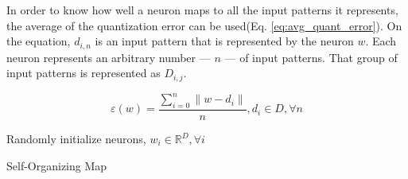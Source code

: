 \documentclass[journal]{IEEEtran}
\begin{document}
In order to know how well a neuron maps to all the input patterns it represents, the average of the quantization error can be used(Eq. \ref{eq:avg_quant_error}). On the equation, $d_{i,n}$ is an input pattern that is represented by the neuron $w$. Each neuron represents an arbitrary number --- $n$ --- of input patterns. That group of input patterns is represented as $D_{i,j}$.
\par

\begin{equation}
  \label{eq:avg_quant_error}
  \varepsilon(w) = \frac{\sum_{i=0}^{n} \| w - d_{i}  \| }{n}, d_{i} \in D, \forall n
\end{equation} 

  \begin{algorithm}
    \label{alg:som}
    \DontPrintSemicolon
    Randomly initialize neurons, $w_i \in \mathbb{R}^{D}, \forall i $ \;
      \caption{Self-Organizing Map \cite[]{Kohonen1990} }
  \end{algorithm}
\end{document}
